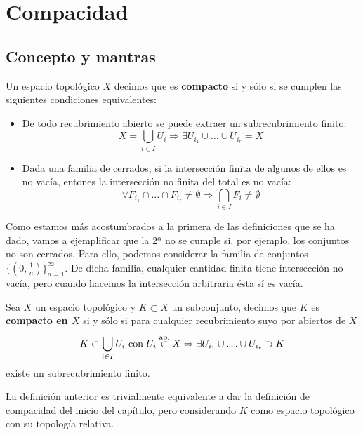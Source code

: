 \chapter{Compacidad}%
\label{cha:compacidad}
\section{Concepto y mantras}%
\label{sec:concepto_y_mantras_comp}
\begin{defi}[Compacidad]
Un espacio topológico $X$ decimos que es \textbf{compacto} si y sólo si se cumplen las siguientes condiciones equivalentes:
\begin{itemize}
\item De todo recubrimiento abierto se puede extraer un subrecubrimiento finito:
\[
X = \bigcup_{i \in  I} U_i \Rightarrow \exists U_{i_1} \cup \ldots \cup U_{i_r} = X
\]
\item Dada una familia de cerrados, si la intersección finita de algunos de ellos es no vacía, entones la intersección no finita del total es no vacía:
\[
\forall F_{i_1} \cap \ldots \cap F_{i_r} \neq \emptyset \Rightarrow \bigcap_{i \in  I} F_i \neq \emptyset
\]
\end{itemize}
\end{defi}

\begin{ej}
Como estamos más acostumbrados a la primera de las definiciones que se ha dado, vamos a ejemplificar que la 2ª no se cumple si, por ejemplo, los conjuntos no son cerrados. Para ello, podemos considerar la familia de conjuntos $\{\left( 0, \frac{1}{n} \right)\}_{n = 1}^\infty$. De dicha familia, cualquier cantidad finita tiene intersección no vacía, pero cuando hacemos la intersección arbitraria ésta sí es vacía.
\end{ej}

\begin{defi}
Sea $X$ un espacio topológico y $K \subset X$ un subconjunto, decimos que $K$ es \textbf{compacto en $X$} si y sólo si para cualquier recubrimiento suyo por abiertos de $X$
\[
K \subset \bigcup_{i \in  I} U_i \text{ con } U_i \stackrel{\text{ab.}}{\subset} X \Rightarrow \exists U_{i_1} \cup \ldots \cup U_{i_r} \supset K
\]
existe un subrecubrimiento finito.
\end{defi}

\begin{obs}
La definición anterior es trivialmente equivalente a dar la definición de compacidad del inicio del capítulo, pero considerando $K$ como espacio topológico con su topología relativa.
\end{obs}

